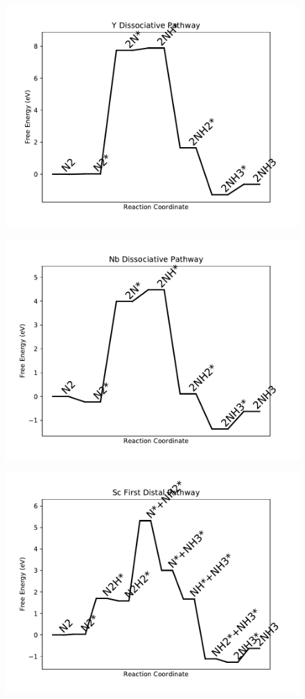 \begin{figure}
\includegraphics[width=0.8\linewidth]{data/plots/Y_dissociative.pdf}
\label{fig:Y_dissociative}
\end{figure}

\begin{figure}
\includegraphics[width=0.8\linewidth]{data/plots/Nb_dissociative.pdf}
\label{fig:Nb_dissociative}
\end{figure}

\begin{figure}
\includegraphics[width=0.8\linewidth]{data/plots/Sc_distal_1.pdf}
\label{fig:Sc_distal_1}
\end{figure}

